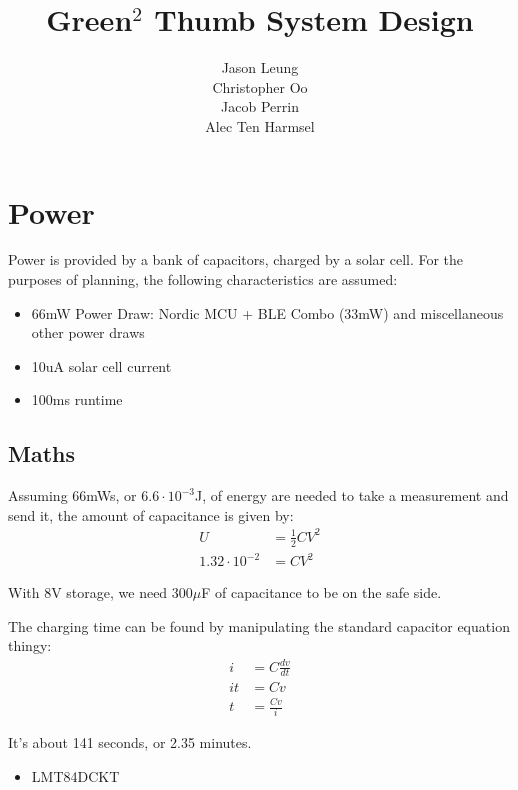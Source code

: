 \documentclass{article}
\begin{document}
\title{Green$^2$ Thumb System Design}
\author{
    Jason Leung\\
    Christopher Oo\\
    Jacob Perrin\\
    Alec Ten Harmsel
}
\date{}
\maketitle

\section{Power}
Power is provided by a bank of capacitors, charged by a solar cell. For the
purposes of planning, the following characteristics are assumed:

\begin{itemize}
    \item 66mW Power Draw: Nordic MCU + BLE Combo (33mW) and miscellaneous
        other power draws
    \item 10uA solar cell current
    \item 100ms runtime
\end{itemize}

\subsection{Maths}
Assuming 66mWs, or $6.6\cdot10^{-3}$J, of energy are needed to take a
measurement and send it, the amount of capacitance is given by: \begin{align*}
    U & = \frac{1}{2}CV^2\\
    1.32 \cdot 10^{-2} & = CV^2
\end{align*}

With 8V storage, we need 300$\mu$F of capacitance to be on the safe side.

The charging time can be found by manipulating the standard capacitor equation
thingy: \begin{align*}
    i & = C\frac{dv}{dt}\\
    it & = Cv\\
    t & = \frac{Cv}{i}
\end{align*}

It's about 141 seconds, or 2.35 minutes.

\begin{itemize}
    \item LMT84DCKT
\end{itemize}
\end{document}

